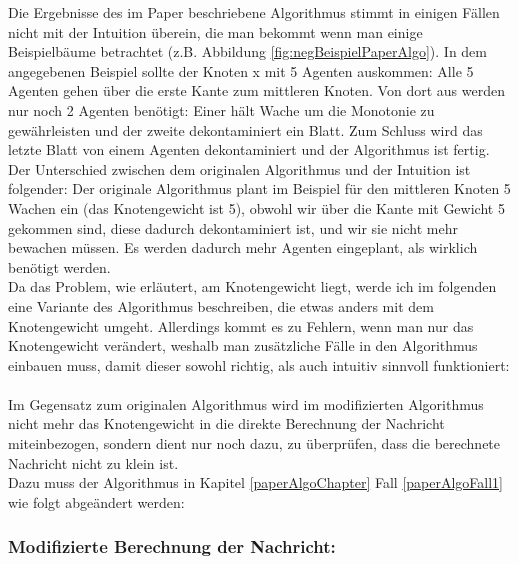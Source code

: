 Die Ergebnisse des im Paper beschriebene Algorithmus stimmt in einigen Fällen nicht mit der Intuition überein, die man bekommt wenn man einige Beispielbäume betrachtet (z.B. Abbildung \ref{fig:negBeispielPaperAlgo}). In dem  angegebenen Beispiel sollte der Knoten x mit 5 Agenten auskommen: Alle 5 Agenten gehen über die erste Kante zum mittleren Knoten. Von dort aus werden nur noch 2 Agenten benötigt: Einer hält Wache um die Monotonie zu gewährleisten und der zweite dekontaminiert ein Blatt. Zum Schluss wird das letzte Blatt von einem Agenten dekontaminiert und der Algorithmus ist fertig.
\\
Der Unterschied zwischen dem originalen Algorithmus und der Intuition ist folgender: Der originale Algorithmus plant im Beispiel für den mittleren Knoten 5 Wachen ein (das Knotengewicht ist 5), obwohl wir über die Kante mit Gewicht 5 gekommen sind, diese dadurch dekontaminiert ist, und wir sie nicht mehr bewachen müssen. Es werden dadurch mehr Agenten eingeplant, als wirklich benötigt werden.
\\
Da das Problem, wie erläutert, am Knotengewicht liegt, werde ich im folgenden eine Variante des Algorithmus beschreiben, die etwas anders mit dem Knotengewicht umgeht. Allerdings kommt es zu Fehlern, wenn man nur das Knotengewicht verändert, weshalb man zusätzliche Fälle in den Algorithmus einbauen muss, damit dieser sowohl richtig, als auch intuitiv sinnvoll funktioniert:
\\
\\
Im Gegensatz zum originalen Algorithmus wird im modifizierten Algorithmus nicht mehr das Knotengewicht in die direkte Berechnung der Nachricht miteinbezogen, sondern dient nur noch dazu, zu überprüfen, dass die berechnete Nachricht nicht zu klein ist.
\\
Dazu muss der Algorithmus in Kapitel \ref{paperAlgoChapter} Fall \ref{paperAlgoFall1} wie folgt abgeändert werden:

\subsubsection*{Modifizierte Berechnung der Nachricht:}

